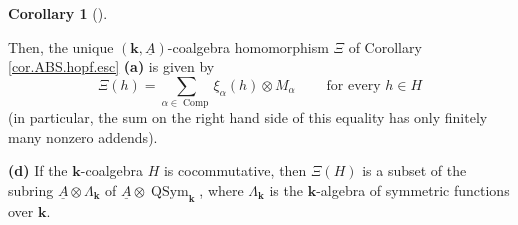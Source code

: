 \documentclass
[numbers=enddot,12pt,final,onecolumn,notitlepage,abstracton]{scrartcl}%
\theoremstyle{definition}
\newtheorem{coro}[theo]{Corollary}
\newenvironment{corollary}[1][]
{\begin{coro}[#1]\begin{leftbar}}
{\end{leftbar}\end{coro}}
\let\sumnonlimits\sum
\renewcommand{\sum}{\sumnonlimits\limits}
\begin{document}
\begin{corollary}
Then, the unique $\left(  \mathbf{k},\underline{A}\right)  $-coalgebra
homomorphism $\Xi$ of Corollary \ref{cor.ABS.hopf.esc} \textbf{(a)} is given
by
\[
\Xi\left(  h\right)  =\sum_{\alpha\in\operatorname*{Comp}}\xi_{\alpha}\left(
h\right)  \otimes M_{\alpha}\ \ \ \ \ \ \ \ \ \ \text{for every }h\in H
\]
(in particular, the sum on the right hand side of this equality has only
finitely many nonzero addends).

\textbf{(d)} If the $\mathbf{k}$-coalgebra $H$ is cocommutative, then
$\Xi\left(  H\right)  $ is a subset of the subring $\underline{A}%
\otimes\Lambda_{\mathbf{k}}$ of $\underline{A}\otimes\operatorname*{QSym}%
\nolimits_{\mathbf{k}}$, where $\Lambda_{\mathbf{k}}$ is the $\mathbf{k}%
$-algebra of symmetric functions over $\mathbf{k}$.
\end{corollary}
\end{document}
